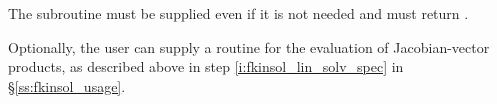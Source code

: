 \begin{Steps}
  {\warn}The subroutine  must be supplied even if it is not needed
  and must return .

  Optionally, the user can supply a routine  for the evaluation of
  Jacobian-vector products, as described above in step \ref{i:fkinsol_lin_solv_spec}
  in \S\ref{ss:fkinsol_usage}.

\end{Steps}
